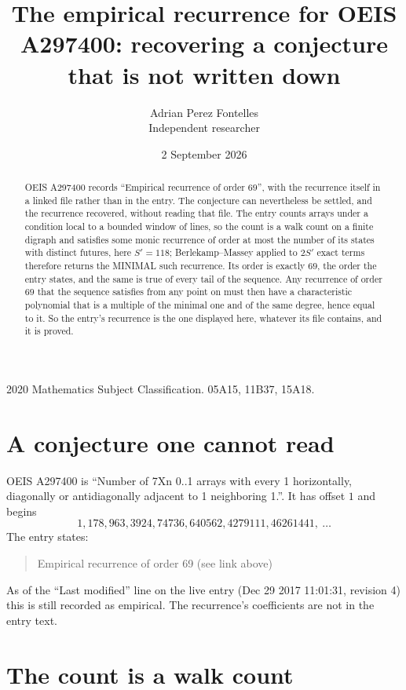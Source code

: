 \documentclass[11pt,a4paper]{article}
\title{The empirical recurrence for OEIS A297400: recovering a conjecture that is not written down}
\author{Adrian Perez Fontelles\\ \small Independent researcher}
\date{2 September 2026}
\theoremstyle{plain}
\theoremstyle{definition}
\begin{document}
\maketitle

\begin{abstract}
OEIS A297400 records ``Empirical recurrence of order $69$'', with the recurrence itself in a
linked file rather than in the entry. The conjecture can nevertheless be settled, and the
recurrence recovered, without reading that file. The entry counts arrays under a condition
local to a bounded window of lines, so the count is a walk count on a finite digraph and
satisfies some monic recurrence of order at most the number of its states with distinct
futures, here $S'=118$; Berlekamp--Massey applied to $2S'$ exact
terms therefore returns the MINIMAL such recurrence. Its order is exactly $69$, the order
the entry states, and the same is true of every tail of the sequence. Any recurrence of order
$69$ that the sequence satisfies from any point on must then have a characteristic
polynomial that is a multiple of the minimal one and of the same degree, hence equal to it. So
the entry's recurrence is the one displayed here, whatever its file contains, and it is
proved.
\end{abstract}

\noindent\small 2020 Mathematics Subject Classification. 05A15, 11B37, 15A18.\normalsize

\section{A conjecture one cannot read}

OEIS A297400 is ``Number of 7Xn 0..1 arrays with every 1 horizontally, diagonally or antidiagonally adjacent to 1 neighboring 1.''. It has offset $1$ and begins
\[
1, 178, 963, 3924, 74736, 640562, 4279111, 46261441,\ \dots
\]
The entry states:
\begin{quote}
Empirical recurrence of order 69 (see link above)
\end{quote}
As of the ``Last modified'' line on the live entry (Dec 29 2017 11:01:31, revision 4) this is still
recorded as empirical. The recurrence's coefficients are not in the entry text.

\section{The count is a walk count}
\end{document}

